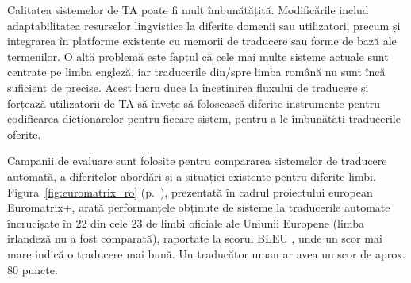 \begin{multicols}{2}
Calitatea sistemelor de TA poate fi mult îmbunătățită. Modificările includ adaptabilitatea resurselor lingvistice la diferite domenii sau utilizatori, precum și integrarea în platforme existente cu memorii de traducere sau forme de bază ale termenilor. O altă problemă este faptul că cele mai multe sisteme actuale sunt centrate pe limba engleză, iar traducerile din/spre limba română nu sunt încă suficient de precise. Acest lucru duce la încetinirea fluxului de traducere și forțează utilizatorii de TA să învețe să folosească diferite instrumente pentru codificarea dicționarelor pentru fiecare sistem, pentru a le îmbunătăți traducerile oferite.

Campanii de evaluare sunt folosite pentru compararea sistemelor de traducere automată, a diferitelor abordări și a situației existente pentru diferite limbi. Figura~\ref{fig:euromatrix_ro} (p.~\pageref{fig:euromatrix_ro}), prezentată în cadrul proiectului european Euromatrix+, arată performanțele obținute de sisteme la traducerile automate încrucișate în 22 din cele 23 de limbi oficiale ale Uniunii Europene (limba irlandeză nu a fost comparată), raportate la scorul BLEU \cite{bleu1}, unde un scor mai mare indică o traducere mai bună. Un traducător uman ar avea un scor de aprox. 80 puncte.


\end{multicols}
